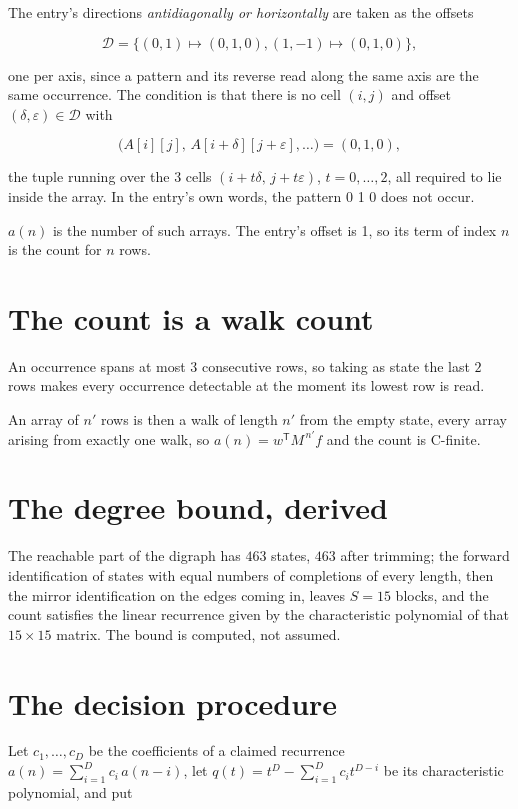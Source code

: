 \documentclass[11pt]{article}
\theoremstyle{definition}
\begin{document}
The entry's directions {\itshape antidiagonally or horizontally} are taken as the offsets

\[\mathcal{D} = \{(0,1)\mapsto(0,1,0), (1,-1)\mapsto(0,1,0)\},\]

one per axis, since a pattern and its reverse read along the same axis are the same occurrence. The condition is that there is no cell $(i,j)$ and offset $(\delta,\varepsilon)\in\mathcal{D}$ with

\[\bigl(A[i][j],\,A[i{+}\delta][j{+}\varepsilon],\dots\bigr) = (0, 1, 0),\]

the tuple running over the $3$ cells $(i+t\delta,\,j+t\varepsilon)$, $t = 0,\dots,2$, all required to lie inside the array. In the entry's own words, the pattern 0 1 0 does not occur.

$a(n)$ is the number of such arrays. The entry's offset is 1, so its term of index $n$ is the count for $n$ rows.

\section{The count is a walk count}

An occurrence spans at most $3$ consecutive rows, so taking as state the last $2$ rows makes every occurrence detectable at the moment its lowest row is read.

An array of $n'$ rows is then a walk of length $n'$ from the empty state, every array arising from exactly one walk, so $a(n) = w^{\mathsf T}M^{\,n'}f$ and the count is C-finite.

\section{The degree bound, derived}

The reachable part of the digraph has $463$ states, $463$ after trimming; the forward identification of states with equal numbers of completions of every length, then the mirror identification on the edges coming in, leaves $S = 15$ blocks, and the count satisfies the linear recurrence given by the characteristic polynomial of that $15\times15$ matrix. The bound is computed, not assumed.

\section{The decision procedure}

Let $c_1,\dots,c_D$ be the coefficients of a claimed recurrence $a(n) = \sum_{i=1}^{D} c_i\,a(n-i)$, let $q(t) = t^{D} - \sum_{i=1}^{D} c_i t^{D-i}$ be its characteristic polynomial, and put
\end{document}
